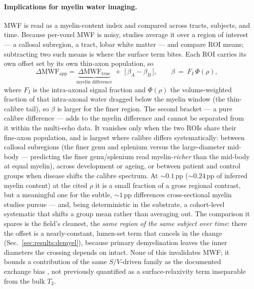 \paragraph{Implications for myelin water imaging.} MWF is read as a myelin-content index
and compared across tracts, subjects, and time. Because per-voxel MWF is noisy, studies
average it over a region of interest --- a callosal subregion, a tract, lobar white
matter --- and compare ROI means; subtracting two such means is where the surface term
bites. Each ROI carries its own offset set by its own thin-axon population, so
\begin{equation}
  \Delta\mathrm{MWF}_{\mathrm{app}}
  = \underbrace{\Delta\mathrm{MWF}_{\mathrm{true}}}_{\text{myelin difference}}
  \;+\;\big[\,\beta_A-\beta_B\,\big],
  \qquad \beta\ =\ F_I\,\Phi(\rho),
  \label{eq:roi_diff}
\end{equation}
where $F_I$ is the intra-axonal signal fraction and $\Phi(\rho)$ the volume-weighted
fraction of that intra-axonal water dragged below the myelin window (the thin-calibre tail),
so $\beta$ is larger for the finer region. The second bracket ---
a pure calibre difference --- adds to the myelin difference and cannot be separated from it
within the multi-echo data. It vanishes only when the two ROIs share their fine-axon
population, and is largest where calibre differs systematically: between callosal
subregions (the finer genu and splenium versus the large-diameter mid-body
\citep{Aboitiz1992} --- predicting the finer genu/splenium read myelin-\emph{richer} than
the mid-body at equal myelin), across development or ageing, or between patient and control
groups when disease shifts the calibre spectrum. At ${\sim}0.1$\,pp (${\sim}0.24$\,pp of
inferred myelin content) at the cited $\rho$ it is a small fraction of a gross regional
contrast, but a meaningful one for the subtle, ${\sim}1$\,pp differences cross-sectional
myelin studies pursue --- and, being deterministic in the substrate, a cohort-level
systematic that shifts a group mean rather than averaging out. The comparison it spares is
the field's cleanest, the \emph{same region of the same subject over time}: there the offset
is a nearly-constant, lumen-set term that cancels in the change
(Sec.~\ref{sec:results:demyel}), because primary demyelination leaves the inner diameters
the crossing depends on intact. None of this invalidates MWF; it bounds a contribution of
the same $S/V$-driven family as the documented exchange bias \citep{Harkins2012}, not
previously quantified as a surface-relaxivity term inseparable from the bulk $T_2$.

